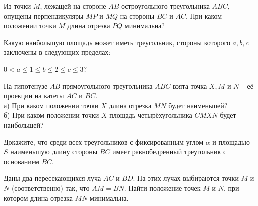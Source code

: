\documentclass{article}
\begin{document}
\begin{enumerate_boxed}
        \item Из точки $M$, лежащей на стороне $AB$ остроугольного треугольника $ABC$, опущены перпендикуляры $MP$ и $MQ$ на стороны $BC$ и $AC$.
        При каком положении точки $M$ длина отрезка $PQ$ минимальна? %

        \item Какую наибольшую площадь может иметь треугольник, стороны которого $a,b,c$ заключены в следующих пределах:

        $0<a\leq 1\leq b\leq 2\leq c\leq 3$?

        \item На гипотенузе $AB$ прямоугольного треугольника $ABC$ взята точка $X, M$ и $N$ – её проекции на катеты $AC$ и $BC$.\\
        а) При каком положении точки $X$ длина отрезка $MN$ будет наименьшей?\\
        б) При каком положении точки $X$ площадь четырёхугольника $CMXN$ будет наибольшей?

        \item Докажите, что среди всех треугольников с фиксированным углом $ \alpha$ и площадью $S$ наименьшую длину стороны $BC$ имеет равнобедренный треугольник с основанием $BC$.

        \item Даны два пересекающихся луча $AC$ и $BD$.
        На этих лучах выбираются точки $M$ и $N$ (соответственно) так, что $AM = BN$.
        Найти положение точек $M$ и $N$, при котором длина отрезка $MN$ минимальна. %

    \end{enumerate_boxed}
\end{document}
